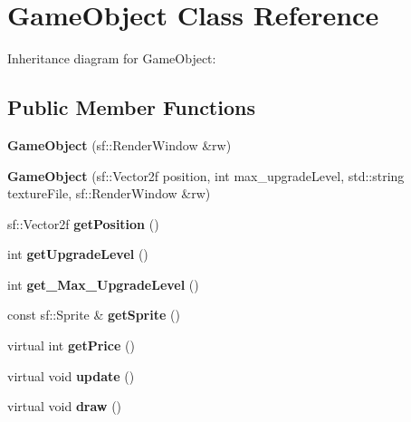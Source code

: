 \hypertarget{class_game_object}{\section{Game\+Object Class Reference}
\label{class_game_object}
}


Inheritance diagram for Game\+Object\+:
\subsection*{Public Member Functions}
\begin{DoxyCompactItemize}
\item 
\hypertarget{class_game_object_abc3e92773e121f06336cef46e4afaf23}{{\bfseries Game\+Object} (sf\+::\+Render\+Window \&rw)}\label{class_game_object_abc3e92773e121f06336cef46e4afaf23}

\item 
\hypertarget{class_game_object_a62ea7d783653a7b8ba0049dcc9e39e37}{{\bfseries Game\+Object} (sf\+::\+Vector2f position, int max\+\_\+upgrade\+Level, std\+::string texture\+File, sf\+::\+Render\+Window \&rw)}\label{class_game_object_a62ea7d783653a7b8ba0049dcc9e39e37}

\item 
\hypertarget{class_game_object_ae682851d1b2d40a793465c959eafafa4}{sf\+::\+Vector2f {\bfseries get\+Position} ()}\label{class_game_object_ae682851d1b2d40a793465c959eafafa4}

\item 
\hypertarget{class_game_object_a9b443cb77313ff5001df50bf223f02a5}{int {\bfseries get\+Upgrade\+Level} ()}\label{class_game_object_a9b443cb77313ff5001df50bf223f02a5}

\item 
\hypertarget{class_game_object_a7c42ff9692e4b4415d67869d7188e3e5}{int {\bfseries get\+\_\+\+Max\+\_\+\+Upgrade\+Level} ()}\label{class_game_object_a7c42ff9692e4b4415d67869d7188e3e5}

\item 
\hypertarget{class_game_object_ab504227dbb8585b121c43487767283f4}{const sf\+::\+Sprite \& {\bfseries get\+Sprite} ()}\label{class_game_object_ab504227dbb8585b121c43487767283f4}

\item 
\hypertarget{class_game_object_a6c8d22e73c9be3c10dda26782f2f348e}{virtual int {\bfseries get\+Price} ()}\label{class_game_object_a6c8d22e73c9be3c10dda26782f2f348e}

\item 
\hypertarget{class_game_object_ad4a07f19f6c5e2e71c89c07486f26244}{virtual void {\bfseries update} ()}\label{class_game_object_ad4a07f19f6c5e2e71c89c07486f26244}

\item 
\hypertarget{class_game_object_a1e6ed94137e78089b2413fe2e2a0b91f}{virtual void {\bfseries draw} ()}\label{class_game_object_a1e6ed94137e78089b2413fe2e2a0b91f}

\end{DoxyCompactItemize}
